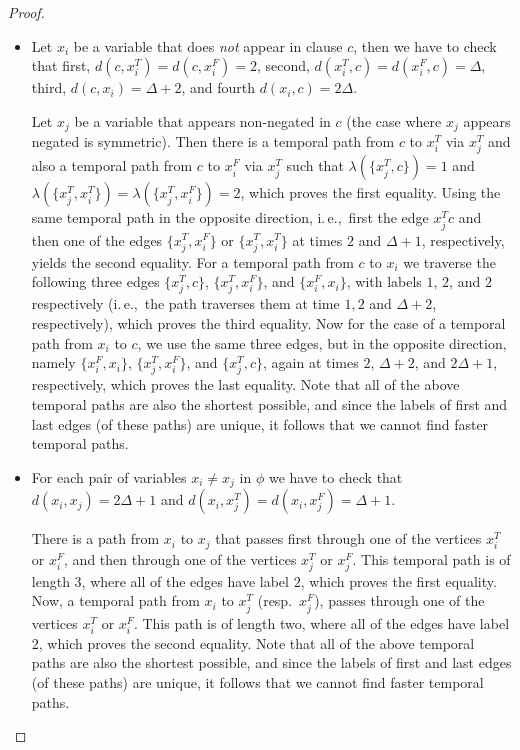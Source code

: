\documentclass[a4paper,UKenglish,cleveref, autoref, thm-restate]{lipics-v2021}
\newcommand{\ie}{i.\,e.,\ }
\begin{document}
\begin{proof}
\begin{itemize}
    \item Let $x_i$ be a variable that does \emph{not} appear in clause $c$, then we have to check that
    first,
    $d(c,x_i^T)=d(c,x_i^F)=2$,
    second, $d(x_i^T, c) = d(x_i^F,c)=\Delta$,
    third, $d(c,x_i)=\Delta + 2$,
    and fourth $d(x_i,c)=2 \Delta$.

    Let $x_j$ be a variable that appears non-negated in $c$ (the case where $x_j$ appears negated is symmetric). 
    Then there is a temporal path 
    from $c$ to $x_i^T$ via $x_j^T$ and also a temporal path 
    from $c$ to $x_i^F$ via $x_j^T$ such that $\lambda(\{x_j^T, c\})=1$ and $\lambda(\{x_j^T, x_i^T\})=\lambda(\{x_j^T, x_i^F\})=2$,
    which proves the first equality.
    Using the same temporal path in the opposite direction,
    \ie first the edge $x_j^T c$ and then one of the edges $\{x_j^T, x_i^F\}$ or $\{x_j^T, x_i^T\}$ at times $2$ and $\Delta + 1$, respectively,
    yields the second equality.
    For a temporal path from $c$ to $x_i$ we traverse the following three edges 
    $\{x_j^T, c\}$, $\{x_j^T, x_i^F\}$, and $\{x_i^F,x_i\}$,
    with labels $1$, $2$, and $2$ respectively (\ie the path traverses them at time $1,2$ and $\Delta + 2$, respectively), which proves the third equality.
    Now for the case of a temporal path from $x_i$ to $c$,
    we use the same three edges, but in the opposite direction,
    namely $\{x_i^F,x_i\}$, $\{x_j^T, x_i^F\}$, and $\{x_j^T, c\}$,
    again at times $2$, $\Delta + 2$, and $2\Delta + 1$, respectively,
    which proves the last equality.
    Note that all of the above temporal paths are also the shortest possible, 
    and since the labels of first and last edges (of these paths) are unique,
    it follows that we cannot find faster temporal paths.
    
    \item For each pair of variables $x_i \neq x_j$ in $\phi$ we have to check that
    $d(x_i,x_j)=2\Delta +1$ and
    $d(x_i,x_j^T)=d(x_i,x_j^F)=\Delta + 1$.

    There is a path from $x_i$ to $x_j$ that passes first through one of the vertices 
    $x_i^T$ or $x_i^F$, 
    and then through one of the vertices $x_j^T$ or $x_j^F$.
    This temporal path is of length $3$, where all of the edges have label $2$,
    which proves the first equality.
    Now, a temporal path from $x_i$ to $x_j^T$ (resp.~$x_j^F$),
    passes through one of the vertices $x_i^T$ or $x_i^F$.
    This path is of length two, where all of the edges have label $2$,
    which proves the second equality.
    Note that all of the above temporal paths are also the shortest possible, 
    and since the labels of first and last edges (of these paths) are unique,
    it follows that we cannot find faster temporal paths.
    

\end{itemize}
\end{proof}
\end{document}
